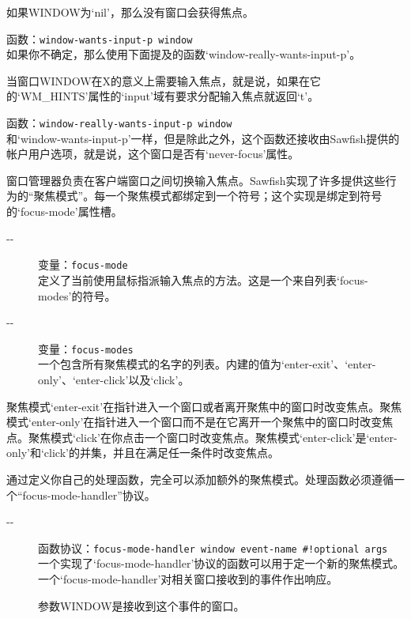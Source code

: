 \documentclass{book}
\begin{document}
\begin{CJK*}{UTF8}{gbsn}
\begin{description}
如果WINDOW为`nil'，那么没有窗口会获得焦点。
\item[-{}-] 函数：\verb|window-wants-input-p window|\\
如果你不确定，那么使用下面提及的函数`window-really-wants-input-p'。

当窗口WINDOW在X的意义上需要输入焦点，就是说，如果在它的`WM\_HINTS'属性的`input'域有要求分配输入焦点就返回`t'。
\item[-{}-] 函数：\verb|window-really-wants-input-p window|\\
和`window-wants-input-p'一样，但是除此之外，这个函数还接收由Sawfish提供的帐户用户选项，就是说，这个窗口是否有`never-focus'属性。
\end{description}

窗口管理器负责在客户端窗口之间切换输入焦点。Sawfish实现了许多提供这些行为的``聚焦模式''。每一个聚焦模式都绑定到一个符号；这个实现是绑定到符号的`focus-mode'属性槽。
\begin{description}
\item[-{}-] 变量：\verb|focus-mode|\\
定义了当前使用鼠标指派输入焦点的方法。这是一个来自列表`focus-modes'的符号。
\item[-{}-] 变量：\verb|focus-modes|\\
一个包含所有聚焦模式的名字的列表。内建的值为`enter-exit'、`enter-only'、`enter-click'以及`click'。
\end{description}

聚焦模式`enter-exit'在指针进入一个窗口或者离开聚焦中的窗口时改变焦点。聚焦模式`enter-only'在指针进入一个窗口而不是在它离开一个聚焦中的窗口时改变焦点。聚焦模式`click'在你点击一个窗口时改变焦点。聚焦模式`enter-click'是`enter-only'和`click'的并集，并且在满足任一条件时改变焦点。

通过定义你自己的处理函数，完全可以添加额外的聚焦模式。处理函数必须遵循一个``focus-mode-handler''协议。
\begin{description}
\item[-{}-] 函数协议：\verb|focus-mode-handler window event-name #!optional args|\\
一个实现了`focus-mode-handler'协议的函数可以用于定一个新的聚焦模式。一个`focus-mode-handler'对相关窗口接收到的事件作出响应。

参数WINDOW是接收到这个事件的窗口。


\end{description}
\end{CJK*}
\end{document}
